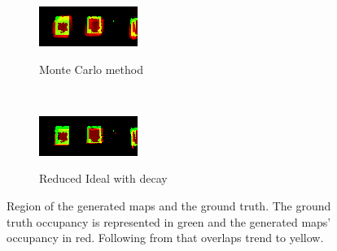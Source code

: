 \begin{figure}[tbph]
	\centering
	\begin{subfigure}[t]{0.45\textwidth}
		\includegraphics[scale=1.5]{figures/static_mapping/color_diff_monte_carlo}		
		\label{fig:monte_carlo_mapsec1}
		\caption{Monte Carlo method}
	\end{subfigure}
	~ %
	\begin{subfigure}[t]{0.45\textwidth}
		\includegraphics[scale=1.5]{figures/static_mapping/color_diff_ideal_decay}
		\label{fig:ideal_deacy_mapsec1}
		\caption{Reduced Ideal with decay}
	\end{subfigure}
	\caption{Region of the generated maps and the ground truth. The ground truth occupancy is represented in green and the generated maps' occupancy in red. Following from that overlaps trend to yellow.}
	\label{fig:box_region_comparison}
\end{figure}

